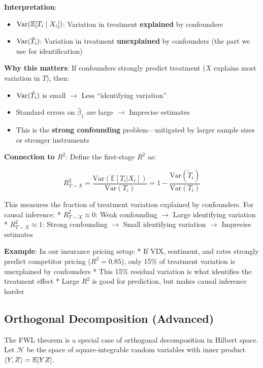 \begin{remark}
\textbf{Interpretation}:
\begin{itemize}
\item $\mathrm{Var}(\mathbb{E}[T_i \mid X_i])$: Variation in treatment \textbf{explained} by confounders
\item $\mathrm{Var}(\tilde{T}_i)$: Variation in treatment \textbf{unexplained} by confounders (the part we use for identification)
\end{itemize}

\textbf{Why this matters}: If confounders strongly predict treatment ($X$ explains most variation in $T$), then:
\begin{itemize}
\item $\mathrm{Var}(\tilde{T}_i)$ is small $\to$ Less ``identifying variation''
\item Standard errors on $\hat{\beta}_1$ are large $\to$ Imprecise estimates
\item This is the \textbf{strong confounding} problem---mitigated by larger sample sizes or stronger instruments
\end{itemize}
\end{remark}

\textbf{Connection to \(R^2\)}: Define the first-stage \(R^2\) as:

\[R^2_{T \sim X} = \frac{\text{Var}(\mathbb{E}[T_i | X_i])}{\text{Var}(T_i)} = 1 - \frac{\text{Var}(\tilde{T}_i)}{\text{Var}(T_i)}\]

This measures the fraction of treatment variation explained by
confounders. For causal inference: * \(R^2_{T \sim X} \approx 0\): Weak
confounding $\to$ Large identifying variation *
\(R^2_{T \sim X} \approx 1\): Strong confounding $\to$ Small identifying
variation $\to$ Imprecise estimates

\textbf{Example}: In our insurance pricing setup: * If VIX, sentiment,
and rates strongly predict competitor pricing (\(R^2 = 0.85\)), only
15\% of treatment variation is unexplained by confounders * This 15\%
residual variation is what identifies the treatment effect * Large
\(R^2\) is good for prediction, but makes causal inference harder

\subsection{Orthogonal Decomposition
(Advanced)}\label{_orthogonal_decomposition_advanced}

The FWL theorem is a special case of orthogonal decomposition in Hilbert
space. Let $\mathcal{H}$ be the space of square-integrable random
variables with inner product $\langle Y, Z \rangle = \mathbb{E}[YZ]$.


